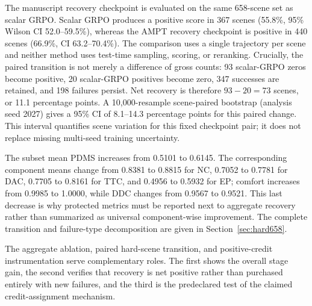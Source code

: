 The manuscript recovery checkpoint is evaluated on the same 658-scene set as
scalar GRPO.  Scalar GRPO produces a positive score in 367 scenes (55.8\%,
95\% Wilson CI 52.0--59.5\%), whereas the AMPT recovery checkpoint is positive
in 440 scenes (66.9\%, CI 63.2--70.4\%).  The comparison uses a single
trajectory per scene and neither method uses test-time sampling, scoring, or
reranking.  Crucially, the paired transition is not merely a difference of
gross counts: 93 scalar-GRPO zeros become positive, 20 scalar-GRPO positives
become zero, 347 successes are retained, and 198 failures persist.  Net
recovery is therefore $93-20=73$ scenes, or 11.1 percentage points.  A
10,000-resample scene-paired bootstrap (analysis seed 2027) gives a 95\% CI of
8.1--14.3 percentage points for this paired change.  This interval quantifies
scene variation for this fixed checkpoint pair; it does not replace missing
multi-seed training uncertainty.

The subset mean PDMS increases from 0.5101 to 0.6145.  The corresponding
component means change from 0.8381 to 0.8815 for NC, 0.7052 to 0.7781 for DAC,
0.7705 to 0.8161 for TTC, and 0.4956 to 0.5932 for EP; comfort increases from
0.9985 to 1.0000, while DDC changes from 0.9567 to 0.9521.  This last decrease
is why protected metrics must be reported next to aggregate recovery rather
than summarized as universal component-wise improvement.  The complete
transition and failure-type decomposition are given in
Section~\ref{sec:hard658}.

The aggregate ablation, paired hard-scene transition, and positive-credit
instrumentation serve complementary roles.  The first shows the overall stage
gain, the second verifies that recovery is net positive rather than purchased
entirely with new failures, and the third is the predeclared test of the
claimed credit-assignment mechanism.
